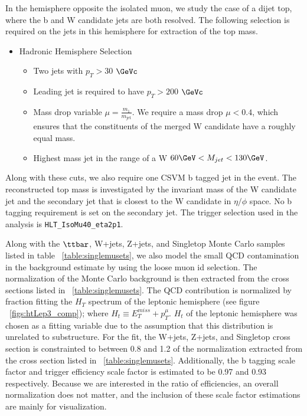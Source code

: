 In the hemisphere opposite the isolated muon, we study the case of a dijet top, where the b and W candidate jets are both resolved.  
The following selection is required on the jets in this hemisphere for extraction of the top mass. 

\begin{itemize}
\item Hadronic Hemisphere Selection
\begin{itemize}
\item Two jets with  $p_T > 30$ $\GeVc$
\item Leading jet is required to have $p_T > 200$ $\GeVc$
\item Mass drop variable $\mu = \frac{m_1}{m_\text{jet}}$.  We require a mass drop $\mu < 0.4$, which ensures that the constituents of the merged W candidate have a roughly equal mass. 
\item Highest mass jet in the range of a W $60\GeV < M_{jet} < 130\GeV$. 
\end{itemize}
\end{itemize}
Along with these cuts, we also require one CSVM b tagged jet in the event.
The reconstructed top mass is investigated by the invariant mass of the W candidate jet and the secondary jet that is 
closest to the W candidate in $\eta/\phi$ space.  No b tagging requirement is set on the secondary jet.  The trigger selection used 
in the analysis is \texttt{HLT\_IsoMu40\_eta2p1}.  

Along with the $\ttbar$, W+jets, Z+jets, and Singletop Monte Carlo samples listed in table ~\ref{table:singlemusets}, we also model the small QCD 
contamination in the background estimate by using the loose muon id selection.  The normalization of the Monte Carlo background is then extracted from the 
cross sections listed in ~\ref{table:singlemusets}.  The QCD contribution is normalized by  
fraction fitting the $H_T$ spectrum of the leptonic hemisphere (see figure ~\ref{figs:htLep3_comp}); where $H_t \equiv E_T^{miss} + p_T^{\mu}$.  $H_t$ of the leptonic hemisphere was chosen as a fitting variable due to the assumption that this 
distribution is unrelated to substructure.  For the fit, the W+jets, Z+jets, and Singletop cross section is constrainted to between 0.8 and 1.2 of the normalization extracted 
from the cross section listed in ~\ref{table:singlemusets}.  Additionally, the b tagging scale factor and trigger efficiency scale factor is estimated to be 
0.97 and 0.93 respectively.  Because we are interested in the ratio of efficiencies, an overall normalization does not matter, and the inclusion of these 
scale factor estimations are mainly for visualization.

